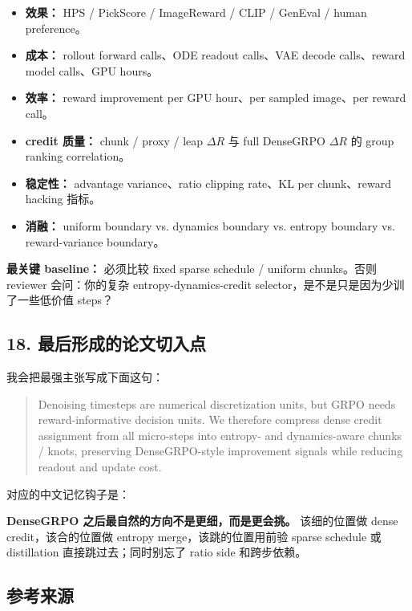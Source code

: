 \begin{itemize}[leftmargin=1.5em]
  \item \textbf{效果：} HPS / PickScore / ImageReward / CLIP / GenEval / human preference。
  \item \textbf{成本：} rollout forward calls、ODE readout calls、VAE decode calls、reward model calls、GPU hours。
  \item \textbf{效率：} reward improvement per GPU hour、per sampled image、per reward call。
  \item \textbf{credit 质量：} chunk / proxy / leap \(\Delta R\) 与 full DenseGRPO \(\Delta R\) 的 group ranking correlation。
  \item \textbf{稳定性：} advantage variance、ratio clipping rate、KL per chunk、reward hacking 指标。
  \item \textbf{消融：} uniform boundary vs. dynamics boundary vs. entropy boundary vs. reward-variance boundary。
\end{itemize}

\begin{warnbox}
\textbf{最关键 baseline：} 必须比较 fixed sparse schedule / uniform chunks。否则 reviewer 会问：你的复杂 entropy-dynamics-credit selector，是不是只是因为少训了一些低价值 steps？
\end{warnbox}

\subsection{18. 最后形成的论文切入点}

我会把最强主张写成下面这句：

\begin{quote}
Denoising timesteps are numerical discretization units, but GRPO needs reward-informative decision units. We therefore compress dense credit assignment from all micro-steps into entropy- and dynamics-aware chunks / knots, preserving DenseGRPO-style improvement signals while reducing readout and update cost.
\end{quote}

对应的中文记忆钩子是：

\begin{summarybox}
\textbf{DenseGRPO 之后最自然的方向不是更细，而是更会挑。} 该细的位置做 dense credit，该合的位置做 entropy merge，该跳的位置用前验 sparse schedule 或 distillation 直接跳过去；同时别忘了 ratio side 和跨步依赖。
\end{summarybox}

\subsection{参考来源}

